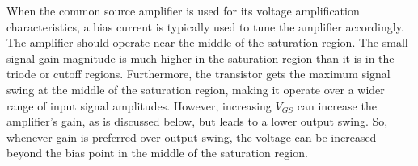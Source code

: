 When the common source amplifier is used for its voltage amplification characteristics, a bias current is typically used to tune the amplifier accordingly. \uline{The amplifier should operate near the middle of the saturation region.} The small-signal gain magnitude is much higher in the saturation region than it is in the triode or cutoff regions. Furthermore, the transistor gets the maximum signal swing at the middle of the saturation region, making it operate over a wider range of input signal amplitudes. However, increasing $V_{GS}$ can increase the amplifier's gain, as is discussed below, but leads to a lower output swing. So, whenever gain is preferred over output swing, the voltage can be increased beyond the bias point in the middle of the saturation region. \\
